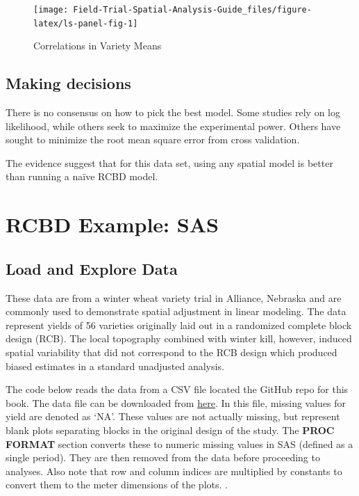 \documentclass[
]{book}
\begin{document}
\begin{figure}

{\centering \texttt{[image: Field-Trial-Spatial-Analysis-Guide\_files/figure-latex/ls-panel-fig-1]} 

}

\caption{Correlations in Variety Means}\label{fig:ls-panel-fig}
\end{figure}

\hypertarget{making-decisions}{%
\section{Making decisions}\label{making-decisions}}

There is no consensus on how to pick the best model. Some studies rely on log likelihood, while others seek to maximize the experimental power. Others have sought to minimize the root mean square error from cross validation.

The evidence suggest that for this data set, using any spatial model is better than running a naïve RCBD model.

\hypertarget{rcbd-sas}{%
\chapter{RCBD Example: SAS}\label{rcbd-sas}}

\hypertarget{load-and-explore-data}{%
\section{Load and Explore Data}\label{load-and-explore-data}}

These data are from a winter wheat variety trial in Alliance, Nebraska \citep{stroup1994} and are commonly used to demonstrate spatial adjustment in linear modeling. The data represent yields of 56 varieties originally laid out in a randomized complete block design (RCB). The local topography combined with winter kill, however, induced spatial variability that did not correspond to the RCB design \citep{stroup2013} which produced biased estimates in a standard unadjusted analysis.

The code below reads the data from a CSV file located the GitHub repo for this book. The data file can be downloaded from \href{https://raw.githubusercontent.com/IdahoAgStats/guide-to-field-trial-spatial-analysis/master/data/stroup_nin_wheat.csv}{here}. In this file, missing values for yield are denoted as `NA'. These values are not actually missing, but represent blank plots separating blocks in the original design of the study. The \textbf{PROC FORMAT} section converts these to numeric missing values in SAS (defined as a single period). They are then removed from the data before proceeding to analyses. Also note that row and column indices are multiplied by constants to convert them to the meter dimensions of the plots. .
\end{document}

